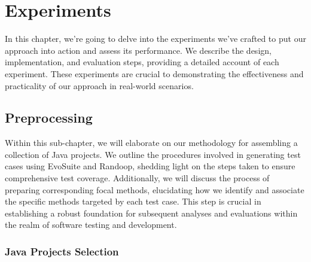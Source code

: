 \chapter{Experiments}
\label{cha:experiments}
\vspace{0.4 cm}

In this chapter, we're going to delve into the experiments we've crafted to put our approach into action and assess its performance. We describe the design, implementation, and evaluation steps, providing a detailed account of each experiment. These experiments are crucial to demonstrating the effectiveness and practicality of our approach in real-world scenarios.

\section{Preprocessing}
\label{sec:exp_preprocessing}
\vspace{0.2 cm}
Within this sub-chapter, we will elaborate on our methodology for assembling a collection of Java projects. We outline the procedures involved in generating test cases using EvoSuite and Randoop\cite{noauthor_randoop_nodate}, shedding light on the steps taken to ensure comprehensive test coverage. Additionally, we will discuss the process of preparing corresponding focal methods, elucidating how we identify and associate the specific methods targeted by each test case. This step is crucial in establishing a robust foundation for subsequent analyses and evaluations within the realm of software testing and development.

\vspace{0.1 cm}
\subsection{Java Projects Selection}
\label{sec:projects_selection}
\vspace{0.1 cm}

